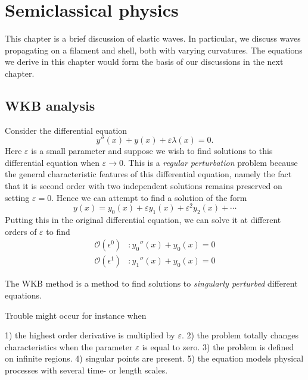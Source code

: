 
\chapter{Semiclassical physics}

This chapter is a brief discussion of elastic waves.
In particular, we discuss waves propagating on a filament and shell, both with varying curvatures.
The equations we derive in this chapter would form the basis of our discussions in the next chapter.

\section{WKB analysis}

Consider the differential equation
%
\begin{equation}
  y''(x) + y(x) + \varepsilon \lambda(x) = 0.
\end{equation}
%
Here $\varepsilon$ is a small parameter and suppose we wish to find solutions to this differential equation when $\varepsilon \to 0$.
This is a \emph{regular perturbation} problem because the general characteristic features of this differential equation, namely the fact that it is second order with two independent solutions remains preserved on setting $\varepsilon = 0$.
Hence we can attempt to find a solution of the form
%
\begin{equation}
  y(x) = y_0(x) + \varepsilon y_{1}(x) + \varepsilon^{2} y_{2}(x) + \cdots
\end{equation}
%
Putting this in the original differential equation, we can solve it at different orders of $\varepsilon$ to find
%
\begin{equation}
  \begin{aligned}
    \mathcal{O}(\epsilon^{0}) &: y_{0}''(x) + y_{0}(x) = 0\\
    \mathcal{O}(\epsilon^{1}) &: y_{1}''(x) + y_{0}(x) = 0
  \end{aligned}
\end{equation}
%

The WKB method is a method to find solutions to \emph{singularly perturbed} different equations.

Trouble might occur for instance when

1) the highest order derivative is multiplied by $\varepsilon$.
2) the problem totally changes characteristics when the parameter $\varepsilon$ is equal to zero.
3) the problem is defined on infinite regions.
4) singular points are present.
5) the equation models physical processes with several time- or length scales.

